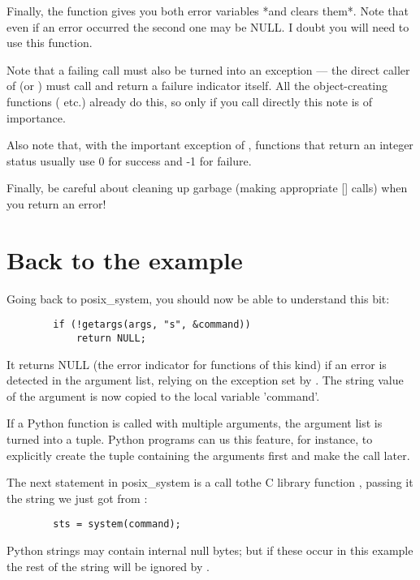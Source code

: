 Finally, the function  gives you both error variables
*and clears them*.  Note that even if an error occurred the second one
may be NULL.  I doubt you will need to use this function.

Note that a failing  call must also be turned into an
exception --- the direct caller of  (or
) must call  and return a failure
indicator itself.  All the object-creating functions
( etc.) already do this, so only if you call
 directly this note is of importance.

Also note that, with the important exception of , functions
that return an integer status usually use 0 for success and -1 for
failure.

Finally, be careful about cleaning up garbage (making appropriate
[] calls) when you return an error!


\section{Back to the example}

Going back to posix_system, you should now be able to understand this
bit:

\begin{verbatim}
        if (!getargs(args, "s", &command))
            return NULL;
\end{verbatim}

It returns NULL (the error indicator for functions of this kind) if an
error is detected in the argument list, relying on the exception set
by .  The string value of the argument is now copied to the
local variable 'command'.

If a Python function is called with multiple arguments, the argument
list is turned into a tuple.  Python programs can us this feature, for
instance, to explicitly create the tuple containing the arguments
first and make the call later.

The next statement in posix_system is a call tothe C library function
, passing it the string we just got from :

\begin{verbatim}
        sts = system(command);
\end{verbatim}

Python strings may contain internal null bytes; but if these occur in
this example the rest of the string will be ignored by .

